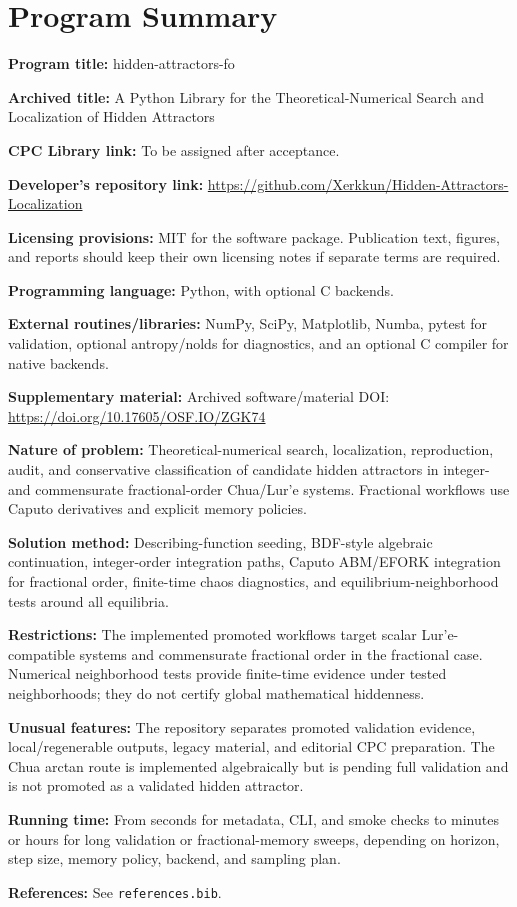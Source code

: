 \section*{Program Summary}

\noindent\textbf{Program title:} hidden-attractors-fo

\noindent\textbf{Archived title:} A Python Library for the Theoretical-Numerical Search and Localization of Hidden Attractors

\noindent\textbf{CPC Library link:} To be assigned after acceptance.

\noindent\textbf{Developer's repository link:} \url{https://github.com/Xerkkun/Hidden-Attractors-Localization}

\noindent\textbf{Licensing provisions:} MIT for the software package. Publication text, figures, and reports should keep their own licensing notes if separate terms are required.

\noindent\textbf{Programming language:} Python, with optional C backends.

\noindent\textbf{External routines/libraries:} NumPy, SciPy, Matplotlib, Numba, pytest for validation, optional antropy/nolds for diagnostics, and an optional C compiler for native backends.

\noindent\textbf{Supplementary material:} Archived software/material DOI: \url{https://doi.org/10.17605/OSF.IO/ZGK74}

\noindent\textbf{Nature of problem:} Theoretical-numerical search, localization, reproduction, audit, and conservative classification of candidate hidden attractors in integer- and commensurate fractional-order Chua/Lur'e systems. Fractional workflows use Caputo derivatives and explicit memory policies.

\noindent\textbf{Solution method:} Describing-function seeding, BDF-style algebraic continuation, integer-order integration paths, Caputo ABM/EFORK integration for fractional order, finite-time chaos diagnostics, and equilibrium-neighborhood tests around all equilibria.

\noindent\textbf{Restrictions:} The implemented promoted workflows target scalar Lur'e-compatible systems and commensurate fractional order in the fractional case. Numerical neighborhood tests provide finite-time evidence under tested neighborhoods; they do not certify global mathematical hiddenness.

\noindent\textbf{Unusual features:} The repository separates promoted validation evidence, local/regenerable outputs, legacy material, and editorial CPC preparation. The Chua arctan route is implemented algebraically but is pending full validation and is not promoted as a validated hidden attractor.

\noindent\textbf{Running time:} From seconds for metadata, CLI, and smoke checks to minutes or hours for long validation or fractional-memory sweeps, depending on horizon, step size, memory policy, backend, and sampling plan.

\noindent\textbf{References:} See \texttt{references.bib}.
